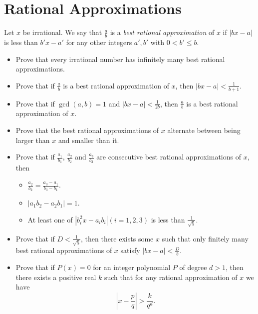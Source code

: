 \documentclass{article}
\begin{document}
\section{Rational Approximations}
Let $x$ be irrational. We say that $\frac ab$ is a \emph{best rational
approximation} of $x$ if $|bx-a|$ is less than $b'x-a'$ for any other integers
$a',b'$ with $0<b'\le b$.
\begin{itemize}
    \item Prove that every irrational number has infinitely many best rational
        approximations.
    \item Prove that if $\frac ab$ is a best rational approximation of $x$, then
        $|bx-a|<\frac 1{b+1}$.
    \item Prove that if $\gcd(a,b)=1$ and $|bx-a|<\frac 1{2b}$, then $\frac ab$
        is a best rational approximation of $x$.
    \item Prove that the best rational approximations of $x$ alternate between
        being larger than $x$ and smaller than it.
    \item Prove that if $\frac{a_1}{b_1}$, $\frac{a_2}{b_2}$ and
        $\frac{a_3}{b_3}$ are consecutive best rational approximations of $x$,
        then
        \begin{itemize}
            \item $\frac{a_2}{b_2}=\frac{a_3-a_1}{b_3-b_1}$.
            \item $|a_1b_2-a_2b_1|=1$.
            \item At least one of $|b_i^2 x-a_i b_i|(i=1,2,3)$ is less than $\frac
                1{\sqrt 5}$.
        \end{itemize}
    \item Prove that if $D<\frac 1{\sqrt 5}$, then there exists some $x$ such
        that only finitely many best rational approximations of $x$ satisfy
        $|bx-a|<\frac Db$.
    \item Prove that if $P(x)=0$ for an integer polynomial $P$ of degree $d>1$,
        then there exists a positive real $k$ such that for any rational
        approximation of $x$ we have
        \[\left|x-\frac pq\right|>\frac k{q^d}.\]
\end{itemize}
\end{document}
